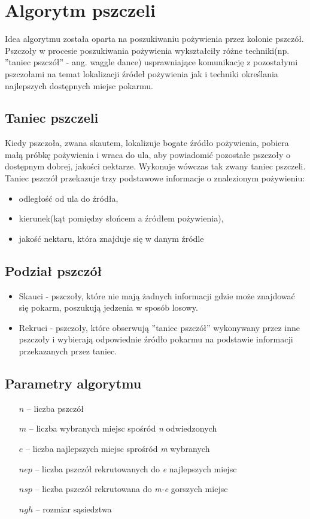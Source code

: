 \documentclass{article}
\begin{document}
\section{Algorytm pszczeli}
Idea algorytmu została oparta na poszukiwaniu pożywienia przez kolonie pszczół. Pszczoły w procesie
poszukiwania pożywienia wykształciły różne techniki(np. ”taniec pszczół”
- ang. waggle dance) usprawniające komunikację z pozostałymi pszczołami
na temat lokalizacji źródeł pożywienia jak i techniki określania najlepszych
dostępnych miejsc pokarmu.

\subsection{Taniec pszczeli}

Kiedy pszczoła, zwana skautem, lokalizuje bogate źródło pożywienia, pobiera małą próbkę pożywienia i wraca do ula, aby powiadomić pozostałe
pszczoły o dostępnym dobrej, jakości nektarze. Wykonuje wówczas tak zwany taniec pszczeli. Taniec pszczół przekazuje trzy podstawowe informacje o znalezionym pożywieniu:
\begin{itemize}
\item odległość od ula do źródła,
\item kierunek(kąt pomiędzy słońcem a źródłem pożywienia),
\item jakość nektaru, która znajduje się w danym źródle\\
\end{itemize}

\subsection{Podział pszczół}
\begin{itemize}
\item Skauci - pszczoły, które nie mają żadnych informacji gdzie może znajdować się pokarm, poszukują jedzenia w sposób losowy.
\item Rekruci - pszczoły, które obserwują ”taniec pszczół” wykonywany przez inne pszczoły i wybierają odpowiednie źródło pokarmu na podstawie informacji przekazanych przez taniec.\\
\end{itemize}


\subsection{Parametry algorytmu}


\begin{itemize}\itemsep2pt
 \item[$n$] -- liczba pszczół
 \item[$m$] -- liczba wybranych miejsc spośród \emph{n}  odwiedzonych
 \item[$e$] -- liczba najlepszych miejsc sprośród \emph{m}  wybranych
 \item[$nep$] -- liczba pszczół rekrutowanych do \emph{e}  najlepszych miejsc 
 \item[$nsp$] -- liczba pszczół rekrutowana do \emph{m-e}  gorszych miejsc
 \item[$ngh$] -- rozmiar sąsiedztwa\\ 
\end{itemize}
\end{document}
